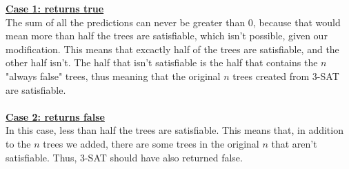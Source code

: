 \documentclass[10pt, letterpaper]{report}
\begin{document}
\textbf{\underline{Case 1: returns true}}\\
The sum of all the predictions can never be greater than 0, because that would mean more than half the trees are satisfiable, which isn't possible, given our modification. This means that excactly half of the trees are satisfiable, and the other half isn't. The half that isn't satisfiable is the half that contains the $n$ "always false" trees, thus meaning that the original $n$ trees created from 3-SAT are satisfiable. \\
\\
\textbf{\underline{Case 2: returns false}}\\
In this case, less than half the trees are satisfiable. This means that, in addition to the $n$ trees we added, there are some trees in the original $n$ that aren't satisfiable. Thus, 3-SAT should have also returned false.
\end{document}
